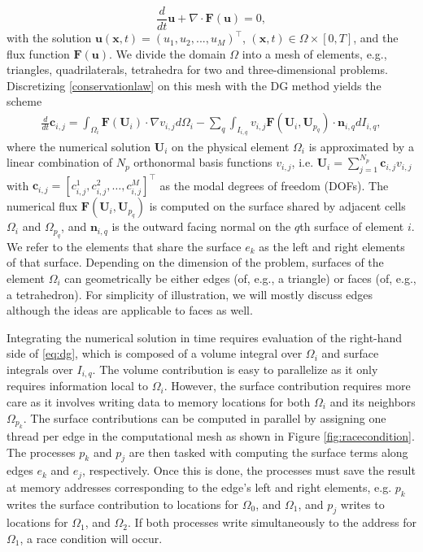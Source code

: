\documentclass[12pt]{article}
\begin{document}
\begin{equation} \label{conservationlaw}
	\frac{d}{dt}\mathbf{u} + \nabla \cdot \mathbf{F}(\mathbf{u})  = 0,
\end{equation}
with the solution $\mathbf{u}(\mathbf{x}, t) = (u_1, u_2,..., u_M)^\intercal$, $(\mathbf{x},t)\in \Omega \times [0,T]$, and the flux function $\mathbf{F}(\mathbf{u})$.  We divide the domain $\Omega$ into a mesh of elements, e.g., triangles, quadrilaterals, tetrahedra for two and three-dimensional problems.  Discretizing \eqref{conservationlaw} on this mesh with the DG method \cite{giuliani} yields the scheme 
\begin{align}
	\label{eq:dg}
	\frac{d}{dt} \mathbf{c}_{i,j} = \int_{\Omega_i} \mathbf{F}(\mathbf{U}_i) \cdot \nabla v_{i,j} d\Omega_i
	- \sum_{q} \int_{I_{i,q}} v_{i,j} \mathbf{F}(\mathbf{U}_i, \mathbf{U}_{p_q}) \cdot \mathbf{n}_{i,q} dI_{i,q},
\end{align}
where the numerical solution $\mathbf{U}_i$ on the physical element $\Omega_i$ is approximated by a linear combination of $N_p$ orthonormal basis functions $v_{i,j}$, i.e. $\mathbf{U}_i = \sum^{N_p}_{j=1}\mathbf{c}_{i,j} v_{i,j}$ with $\mathbf{c}_{i,j} = [c^1_{i,j}, c^2_{i,j},\dots, c^M_{i,j}]^\intercal$ as the modal degrees of freedom (DOFs). The numerical flux $\mathbf{F}(\mathbf{U}_i,\mathbf{U}_{p_q})$ is computed on the surface shared by adjacent cells $\Omega_i$ and $\Omega_{p_q}$, and $\mathbf{n}_{i,q}$ is the outward facing normal on the $q$th surface of element $i$.  We refer to the elements that share the surface $e_k$ as the left and right elements of that surface.  Depending on the dimension of the problem, surfaces of the element $\Omega_i$ can geometrically be either edges (of, e.g., a triangle) or faces (of, e.g., a tetrahedron).  For simplicity of illustration, we will mostly discuss edges although the ideas are applicable to faces as well.  

Integrating the numerical solution in time requires evaluation of the right-hand side of \eqref{eq:dg}, which is composed of a volume integral over $\Omega_i$ and surface integrals over $I_{i,q}$.  The volume contribution is easy to parallelize as it only requires information local to $\Omega_i$.  However, the surface contribution requires more care as it involves writing data to memory locations for both $\Omega_i$ and its neighbors $\Omega_{p_k}$. The surface contributions can be computed in parallel by assigning one thread per edge in the computational mesh as shown in Figure \ref{fig:racecondition}.  The processes $p_k$ and $p_{j}$ are then tasked with computing the surface terms along edges $e_k$ and $e_j$, respectively.  Once this is done, the processes must save the result at memory addresses corresponding to the edge's left and right elements, e.g. $p_k$ writes the surface contribution to locations for $\Omega_0$, and $\Omega_1$, and $p_j$ writes to locations for $\Omega_1$, and $\Omega_2$. If both processes write simultaneously to the address for $\Omega_1$, a race condition will occur.
\end{document}
